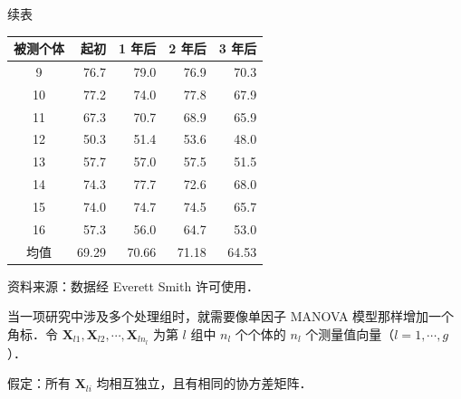 
\begin{mvtable}
\noindent\hfill{续表}\par
\begin{tabular}{crrrr}
\toprule
被测个体 & 起初 & 1 年后 & 2 年后 & 3 年后\\
\midrule
9 & 76.7 & 79.0 & 76.9 & 70.3\\
10 & 77.2 & 74.0 & 77.8 & 67.9\\
11 & 67.3 & 70.7 & 68.9 & 65.9\\
12 & 50.3 & 51.4 & 53.6 & 48.0\\
13 & 57.7 & 57.0 & 57.5 & 51.5\\
14 & 74.3 & 77.7 & 72.6 & 68.0\\
15 & 74.0 & 74.7 & 74.5 & 65.7\\
16 & 57.3 & 56.0 & 64.7 & 53.0\\
\midrule
均值 & 69.29 & 70.66 & 71.18 & 64.53\\
\bottomrule
\end{tabular}
\end{mvtable}

资料来源：数据经 Everett Smith 许可使用．

当一项研究中涉及多个处理组时，就需要像单因子 MANOVA 模型那样增加一个角标．令 $\mathbf{X}_{l1},\mathbf{X}_{l2},\cdots,\mathbf{X}_{ln_l}$ 为第 $l$ 组中 $n_l$ 个个体的 $n_l$ 个测量值向量（$l=1,\cdots,g$）．

假定：所有 $\mathbf{X}_{li}$ 均相互独立，且有相同的协方差矩阵．

